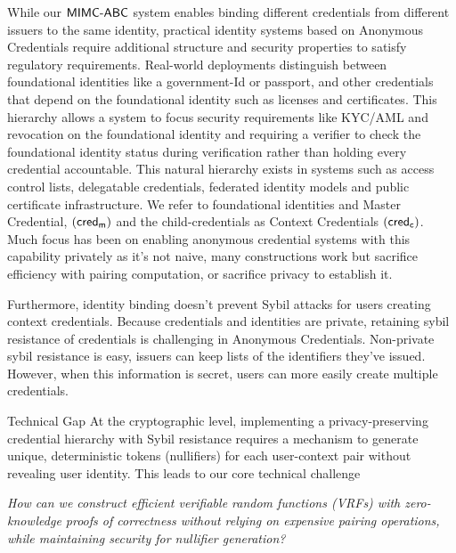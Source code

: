 
While our $\mathsf{MIMC\text{-}ABC}$ system enables binding different credentials from different issuers to the same identity, practical identity systems based on Anonymous Credentials require additional structure and security properties to satisfy regulatory requirements. Real-world deployments distinguish between foundational identities like a government-Id or passport, and other credentials that depend on the foundational identity such as licenses and certificates. This hierarchy allows a system to focus security requirements like KYC/AML and revocation on the foundational identity and requiring a verifier to check the foundational identity status during verification rather than holding every credential accountable. 
This natural hierarchy exists in systems such as access control lists, delegatable credentials, federated identity models and public certificate infrastructure. We refer to foundational identities and Master Credential, $(\mathsf{cred_m})$ and the child-credentials as Context Credentials $(\mathsf{cred_c})$. Much focus has been on enabling anonymous credential systems with this capability \cite{crites_syra_2024, rabaninejad_attribute-based_2024, maram2021candid} privately as it's not naive, many constructions work but sacrifice efficiency with pairing computation, or sacrifice privacy to establish it. 

Furthermore, identity binding doesn't prevent Sybil attacks for users creating context credentials. Because credentials and identities are private, retaining sybil resistance of credentials is challenging in Anonymous Credentials. Non-private sybil resistance is easy, issuers can keep lists of the identifiers they've issued. However, when this information is secret, users can more easily create multiple credentials. 

Technical Gap
At the cryptographic level, implementing a privacy-preserving credential hierarchy with Sybil resistance requires a mechanism to generate unique, deterministic tokens (nullifiers) for each user-context pair without revealing user identity. This leads to our core technical challenge

\begin{center} 
    \emph{How can we construct efficient verifiable random functions (VRFs) with zero-knowledge proofs of correctness without relying on expensive pairing operations, while maintaining security for nullifier generation?}
\end{center}




